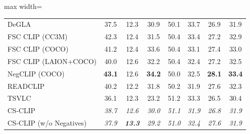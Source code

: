 \begin{table}[t]
\begin{adjustbox}{max width=\textwidth}
\begin{tabular}{p{5cm}c|c|c|c|c|c|c}
    DeGLA & 37.5 & 12.3 & 30.9 & 50.1 & 33.7 & 26.9 & 31.9 \\
    FSC CLIP (CC3M) & 42.3 & 12.4 & 31.5 & 50.4 & 33.4 & 27.2 & 32.9 \\
    FSC CLIP (COCO) & 41.2 & 12.4 & 33.6 & 50.4 & 33.1 & 27.4 & 33.0 \\
    FSC CLIP (LAION+COCO) & 40.0 & 12.6 & 32.2 & 50.4 & 32.4 & 27.2 & 32.5 \\
    NegCLIP (COCO) & \textbf{43.1} & 12.6 & \textbf{34.2} & 50.0 & 32.5 & \textbf{28.1} & \textbf{33.4} \\
    READCLIP & 40.2 & 12.2 & 31.8 & 50.2 & 31.9 & 27.6 & 32.3 \\
    TSVLC & 36.1 & 12.3 & 23.2 & 51.2 & 33.3 & 26.5 & 30.4 \\
    \midrule
    CS-CLIP & \emph{38.7} & \emph{12.6} & \emph{30.0} & \emph{51.1} & \emph{31.9} & \emph{26.8} & \emph{31.9} \\
    CS-CLIP (w/o Negatives) & \emph{37.9} & \emph{\textbf{13.3}} & \emph{29.2} & \emph{51.0} & \emph{32.4} & \emph{27.6} & \emph{31.9} \\
    \bottomrule
  \end{tabular}
  \end{adjustbox}
\end{table}

